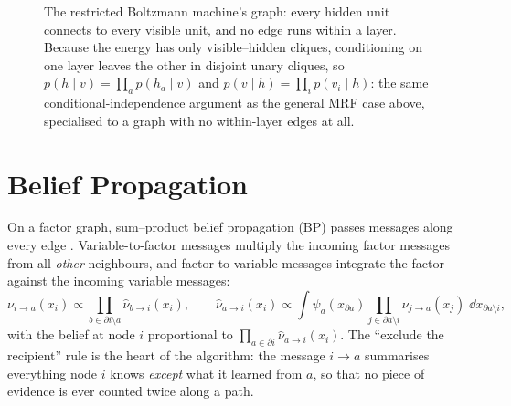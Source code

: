 \begin{figure}[t]\centering
{}
\caption[The RBM as a bipartite factor graph]{The restricted Boltzmann
machine's graph: every hidden unit connects to every visible unit, and no
edge runs within a layer. Because the energy has only
visible--hidden cliques, conditioning on one layer leaves the other in
disjoint unary cliques, so $p(h\mid v)=\prod_a p(h_a\mid v)$ and
$p(v\mid h)=\prod_i p(v_i\mid h)$: the same conditional-independence
argument as the general MRF case above, specialised to a graph with no
within-layer edges at all.}
\label{fig:rbm-graph}
\end{figure}

\section{Belief Propagation}\label{sec:sum-product}

On a factor graph, sum--product belief propagation (BP) passes messages
along every edge \citep{pearl1988probabilistic, kschischang2001factor,
mezard2009information}. Variable-to-factor messages multiply the
incoming factor messages from all \emph{other} neighbours, and
factor-to-variable messages integrate the factor against the incoming
variable messages:
\begin{equation}
  \nu_{i \to a}(x_i) \propto
    \prod_{b \in \partial i \setminus a} \hat\nu_{b \to i}(x_i),
  \qquad
  \hat\nu_{a \to i}(x_i) \propto
    \int \psi_a(x_{\partial a})
    \prod_{j \in \partial a \setminus i} \nu_{j \to a}(x_j)\;
    \dd x_{\partial a \setminus i},
  \label{eq:bp-rules}
\end{equation}
with the belief at node $i$ proportional to
$\prod_{a \in \partial i} \hat\nu_{a \to i}(x_i)$. The ``exclude the
recipient'' rule is the heart of the algorithm: the message $i \to a$
summarises everything node $i$ knows \emph{except} what it learned from
$a$, so that no piece of evidence is ever counted twice along a path.

